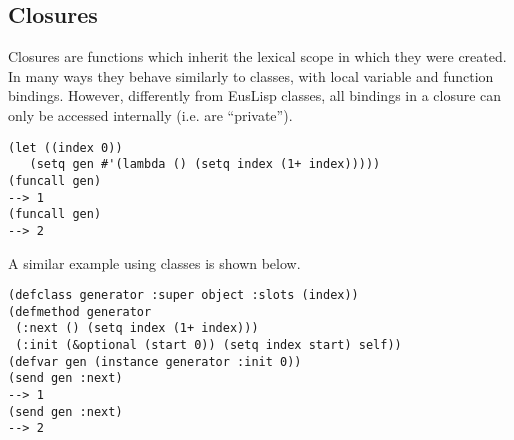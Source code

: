 \subsection{Closures}

Closures are functions which inherit the lexical scope in which they were created.
In many ways they behave similarly to classes, with local variable and function bindings.
However, differently from EusLisp classes, all bindings in a closure can only be accessed
internally (i.e. are ``private'').

\begin{verbatim}
(let ((index 0))
   (setq gen #'(lambda () (setq index (1+ index)))))
(funcall gen)
--> 1
(funcall gen)
--> 2
\end{verbatim}

A similar example using classes is shown below.
\begin{verbatim}
(defclass generator :super object :slots (index))
(defmethod generator
 (:next () (setq index (1+ index)))
 (:init (&optional (start 0)) (setq index start) self))
(defvar gen (instance generator :init 0))
(send gen :next)
--> 1
(send gen :next)
--> 2
\end{verbatim}
\newpage
